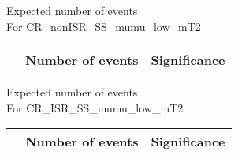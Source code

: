 \begin{frame}{Expected number of events \\For CR\_nonISR\_SS\_mumu\_low\_mT2}
\vspace{5mm}
\begin{tabular}{|c|c|c|}
\hline
& Number of events & Significance \\
\hline

\end{tabular}
\end{frame}

\begin{frame}{Expected number of events \\For CR\_ISR\_SS\_mumu\_low\_mT2}
\vspace{5mm}
\begin{tabular}{|c|c|c|}
\hline
& Number of events & Significance \\
\hline

\end{tabular}
\end{frame}

